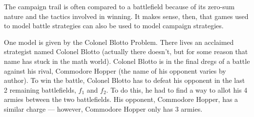 \documentclass[11pt]{article}
\begin{document}
The campaign trail is often compared to a battlefield because of its
zero-sum nature and the tactics involved in winning. It makes sense,
then, that games used to model battle strategies can also be used to
model campaign strategies.

One model is given by the Colonel Blotto Problem. There lives an
acclaimed strategist named Colonel Blotto (actually there doesn't, but
for some reason that name has stuck in the math world). Colonel Blotto
is in the final dregs of a battle against his rival, Commodore
Hopper\cite{hopper} (the name of his opponent varies by author). To win the battle, Colonel Blotto has to defeat
his opponent in the last 2 remaining battlefields, $f_1$ and $f_2$. To
do this, he had to find a way to allot his 4 armies between the two
battlefields. His opponent, Commodore Hopper, has a similar charge ---
however, Commodore Hopper only has 3 armies.
\end{document}
